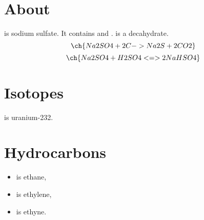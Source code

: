 \documentclass{scrartcl}
\begin{document}
\section*{About }
 is sodium sulfate.
It contains  and .
 is a decahydrate.
\[
\ch{Na2SO4 + 2 C -> Na2S + 2 CO2}
\]
\begin{equation}
\ch{Na2SO4 + H2SO4 <=> 2 NaHSO4}
\end{equation}
\section*{Isotopes}
 is uranium-232.
\section*{Hydrocarbons}
\begin{itemize}
  \item {} is ethane,
  \item {} is ethylene,
  \item {} is ethyne.
\end{itemize}
\end{document}
